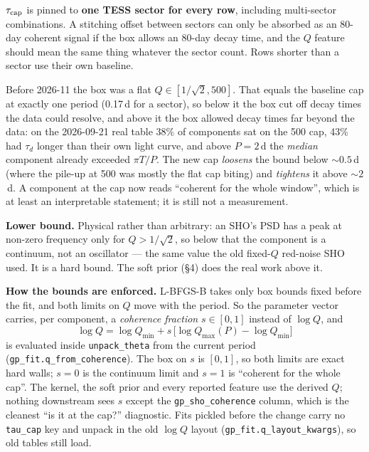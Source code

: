 \documentclass[11pt]{article}
\newcommand{\code}[1]{\texttt{#1}}
\begin{document}
$\tau_{\rm cap}$ is pinned to \textbf{one TESS sector for every row}, including multi-sector
combinations. A stitching offset between sectors can only be absorbed as an 80-day coherent
signal if the box allows an 80-day decay time, and the $Q$ feature should mean the same thing
whatever the sector count. Rows shorter than a sector use their own baseline.

Before 2026-11 the box was a flat $Q \in [1/\sqrt2, 500]$. That equals the baseline cap at
exactly one period (0.17\,d for a sector), so below it the box cut off decay times the data
could resolve, and above it the box allowed decay times far beyond the data: on the
2026-09-21 real table 38\% of components sat on the 500 cap, 43\% had $\tau_d$ longer than
their own light curve, and above $P = 2$\,d the \emph{median} component already exceeded
$\pi T/P$. The new cap \emph{loosens} the bound below $\sim 0.5$\,d (where the pile-up at 500
was mostly the flat cap biting) and \emph{tightens} it above $\sim 2$\,d. A component at the
cap now reads ``coherent for the whole window'', which is at least an interpretable
statement; it is still not a measurement.

\textbf{Lower bound.} Physical rather than arbitrary: an SHO's PSD has a peak at non-zero
frequency only for $Q > 1/\sqrt2$, so below that the component is a continuum, not an
oscillator --- the same value the old fixed-$Q$ red-noise SHO used. It is a hard bound. The
soft prior (\S4) does the real work above it.

\textbf{How the bounds are enforced.} L-BFGS-B takes only box bounds fixed before the fit,
and both limits on $Q$ move with the period. So the parameter vector carries, per
component, a \emph{coherence fraction} $s \in [0,1]$ instead of $\log Q$, and
\begin{equation}
\log Q = \log Q_{\min} + s\,\bigl[\log Q_{\max}(P) - \log Q_{\min}\bigr]
\end{equation}
is evaluated inside \code{unpack\_theta} from the current period
(\code{gp\_fit.q\_from\_coherence}). The box on $s$ is $[0,1]$, so both limits are exact hard
walls; $s = 0$ is the continuum limit and $s = 1$ is ``coherent for the whole cap''. The
kernel, the soft prior and every reported feature use the derived $Q$; nothing downstream
sees $s$ except the \code{gp\_sho\_coherence} column, which is the cleanest ``is it at the
cap?'' diagnostic. Fits pickled before the change carry no \code{tau\_cap} key and unpack in
the old $\log Q$ layout (\code{gp\_fit.q\_layout\_kwargs}), so old tables still load.
\end{document}
